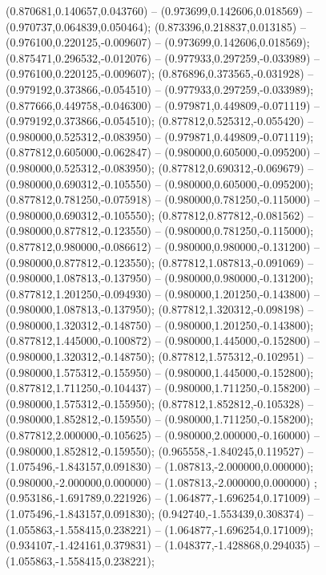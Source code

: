 (0.870681,0.140657,0.043760) -- (0.973699,0.142606,0.018569) -- (0.970737,0.064839,0.050464);
 (0.873396,0.218837,0.013185) -- (0.976100,0.220125,-0.009607) -- (0.973699,0.142606,0.018569);
 (0.875471,0.296532,-0.012076) -- (0.977933,0.297259,-0.033989) -- (0.976100,0.220125,-0.009607);
 (0.876896,0.373565,-0.031928) -- (0.979192,0.373866,-0.054510) -- (0.977933,0.297259,-0.033989);
 (0.877666,0.449758,-0.046300) -- (0.979871,0.449809,-0.071119) -- (0.979192,0.373866,-0.054510);
 (0.877812,0.525312,-0.055420) -- (0.980000,0.525312,-0.083950) -- (0.979871,0.449809,-0.071119);
 (0.877812,0.605000,-0.062847) -- (0.980000,0.605000,-0.095200) -- (0.980000,0.525312,-0.083950);
 (0.877812,0.690312,-0.069679) -- (0.980000,0.690312,-0.105550) -- (0.980000,0.605000,-0.095200);
 (0.877812,0.781250,-0.075918) -- (0.980000,0.781250,-0.115000) -- (0.980000,0.690312,-0.105550);
 (0.877812,0.877812,-0.081562) -- (0.980000,0.877812,-0.123550) -- (0.980000,0.781250,-0.115000);
 (0.877812,0.980000,-0.086612) -- (0.980000,0.980000,-0.131200) -- (0.980000,0.877812,-0.123550);
 (0.877812,1.087813,-0.091069) -- (0.980000,1.087813,-0.137950) -- (0.980000,0.980000,-0.131200);
 (0.877812,1.201250,-0.094930) -- (0.980000,1.201250,-0.143800) -- (0.980000,1.087813,-0.137950);
 (0.877812,1.320312,-0.098198) -- (0.980000,1.320312,-0.148750) -- (0.980000,1.201250,-0.143800);
 (0.877812,1.445000,-0.100872) -- (0.980000,1.445000,-0.152800) -- (0.980000,1.320312,-0.148750);
 (0.877812,1.575312,-0.102951) -- (0.980000,1.575312,-0.155950) -- (0.980000,1.445000,-0.152800);
 (0.877812,1.711250,-0.104437) -- (0.980000,1.711250,-0.158200) -- (0.980000,1.575312,-0.155950);
 (0.877812,1.852812,-0.105328) -- (0.980000,1.852812,-0.159550) -- (0.980000,1.711250,-0.158200);
 (0.877812,2.000000,-0.105625) -- (0.980000,2.000000,-0.160000) -- (0.980000,1.852812,-0.159550);
 (0.965558,-1.840245,0.119527) -- (1.075496,-1.843157,0.091830) -- (1.087813,-2.000000,0.000000);
 (0.980000,-2.000000,0.000000) -- (1.087813,-2.000000,0.000000) ;
 (0.953186,-1.691789,0.221926) -- (1.064877,-1.696254,0.171009) -- (1.075496,-1.843157,0.091830);
 (0.942740,-1.553439,0.308374) -- (1.055863,-1.558415,0.238221) -- (1.064877,-1.696254,0.171009);
 (0.934107,-1.424161,0.379831) -- (1.048377,-1.428868,0.294035) -- (1.055863,-1.558415,0.238221);
